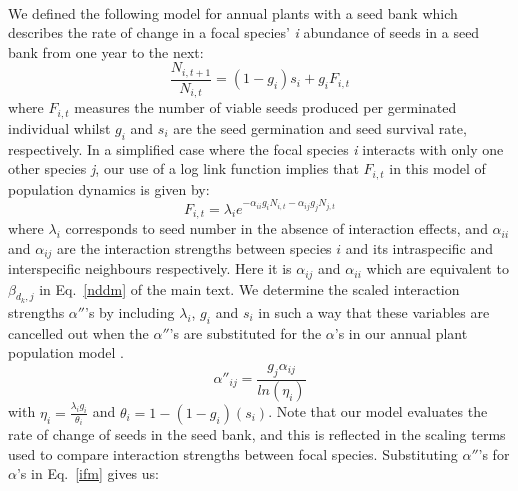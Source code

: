 \documentclass[a4,12pt]{article}
\begin{document}
        \paragraph{} 
        We defined the following model for annual plants with a seed bank \parencite{Levine2009, Mayfield2017, Bimler2018} which describes the rate of change in a focal species' \textit{i} abundance of seeds in a seed bank from one year to the next: 
            \begin{equation}
                \frac{N_{i, t+1}}{N_{i, t}} = \left( 1 - g_{i} \right) s_{i} + g_{i}F_{i, t}
                \label{ifm}
            \end{equation}
        where \(F_{i,t}\) measures the number of viable seeds produced per germinated individual whilst \(g_{i}\) and \(s_{i}\) are the seed germination and seed survival rate, respectively. In a simplified case where the focal species \textit{i} interacts with only one other species \textit{j}, our use of a log link function implies that \(F_{i,t}\) in this model of population dynamics is given by:
            \begin{equation}
                F_{i,t} = \lambda_{i} e^{- \alpha_{ii} g_{i} N_{i, t} -  \alpha_{ij} g_{j} N_{j, t} }
                \label{fecundity}   
            \end{equation}
        where \(\lambda_{i}\) corresponds to seed number in the absence of interaction effects, and \(\alpha_{ii}\) and \(\alpha_{ij}\) are the interaction strengths between species \(i\) and its intraspecific and interspecific neighbours respectively. Here it is \(\alpha_{ij}\) and \(\alpha_{ii}\) which are equivalent to \(\beta_{d_k, j}\) in Eq.~\ref{nddm} of the main text. 
        We determine the scaled interaction strengths ${\alpha}''$'s by including \(\lambda_{i}\), \(g_{i}\) and \(s_{i}\) in such a way that these variables are cancelled out when the ${\alpha}''$'s are substituted for the $\alpha$'s in our annual plant population model \parencite{Godoy2014, Bimler2018}. 
        \begin{equation}
            {\alpha}''_{ij} = \frac{g_{j} \alpha_{ij}}{ln(\eta_{i})}
        \end{equation}
        with $\eta_{i} = \frac{\lambda_{i} g_{i}}{\theta_{i}}$ and $\theta_{i} = 1 - (1 - g_{i})(s_{i})$. %
        Note that our model evaluates the rate of change of seeds in the seed bank, and this is reflected in the scaling terms used to compare interaction strengths between focal species. Substituting ${\alpha}''$'s for $\alpha$'s in Eq.~\ref{ifm} gives us: 
    
\end{document}
